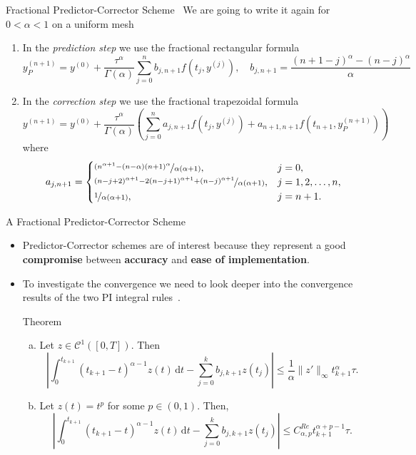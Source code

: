 \documentclass[aspectratio=169,xcolor=dvipsnames]{beamer}
\begin{document}
\begin{frame}{\Large Fractional Predictor-Corrector Scheme~\parencite{FRACPECE}}
We are going to write it again for $ 0 < \alpha < 1$ on a uniform mesh

\begin{enumerate}
	\item<1-> In the \emph{prediction step} we use the fractional rectangular formula
	\[
	y^{(n+1)}_P = y^{(0)} + \frac{\tau^\alpha}{\Gamma(\alpha)} \sum_{j=0}^{n} b_{j,n+1} f(t_j,y^{(j)}), \quad b_{j,n+1} = \frac{(n+1-j)^\alpha - (n-j)^\alpha}{\alpha}
	\]
	\item<2-> In the \emph{correction step} we use the fractional trapezoidal formula
	\[
	y^{(n+1)} = y^{(0)} + \frac{\tau^\alpha}{\Gamma(\alpha)} \left( \sum_{j=0}^{n} a_{j,n+1} f(t_j,y^{(j)}) + a_{n+1,n+1}f(t_{n+1},y^{(n+1)}_P) \right)
	\]
	where
	\[
	a_{j,n+1} = \begin{cases}
	\nicefrac{(n^{\alpha+1} - (n-\alpha)(n+1)^\alpha}{\alpha(\alpha+1)}, & j = 0,\\
	\nicefrac{(n-j+2)^{\alpha+1} -2(n-j+1)^{\alpha+1} + (n-j)^{\alpha+1}}{\alpha(\alpha+1)}, & j = 1,2,\ldots,n, \\
	\nicefrac{1}{\alpha(\alpha+1)}, & j = n+1.
	\end{cases}
	\]
\end{enumerate}

\end{frame}

\begin{frame}{A Fractional Predictor-Corrector Scheme}

\begin{itemize}
	\item Predictor-Corrector schemes are of interest because they represent a good \textbf{compromise} between \textbf{accuracy} and \textbf{ease of implementation}.
	\item<2> To investigate the convergence we need to look deeper into the convergence results of the two PI integral rules~\parencite{FractionalAdamsMethodsAnalysis}.
	\begin{alertblock}{Theorem~\parencite[Theorem 2.4]{FractionalAdamsMethodsAnalysis}}
	\begin{enumerate}[(a)]
	\item Let $z \in \mathcal{C}^1([0,T])$. Then\vspace{-0.5em}
	\[
	\left\lvert \int_{0}^{t_{k+1}} (t_{k+1}-t)^{\alpha-1}z(t)\,\textrm{d}t - \sum_{j=0}^{k} b_{j,k+1}z(t_j) \right\rvert \leq \frac{1}{\alpha} \|z'\|_\infty t_{k+1}^{\alpha} \tau.
	\]
	\item Let $z(t) = t^p$ for some $p \in (0,1)$. Then,\vspace{-0.5em}
	\[
	\left\lvert \int_{0}^{t_{k+1}} (t_{k+1}-t)^{\alpha-1}z(t)\,\textrm{d}t - \sum_{j=0}^{k} b_{j,k+1}z(t_j) \right\rvert \leq C_{\alpha,p}^{Re} t_{k+1}^{\alpha+p-1} \tau.
	\]
	\end{enumerate}
	\end{alertblock}
	
\end{itemize}

\end{frame}
\end{document}
